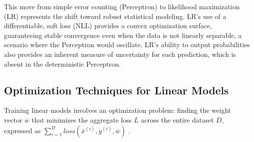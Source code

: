 \documentclass{article}
\begin{document}
This move from simple error counting (Perceptron) to likelihood maximization (LR) represents the shift toward robust statistical modeling. LR's use of a differentiable, soft loss (NLL) provides a convex optimization surface, guaranteeing stable convergence even when the data is not linearly separable, a scenario where the Perceptron would oscillate. LR’s ability to output probabilities also provides an inherent measure of uncertainty for each prediction, which is absent in the deterministic Perceptron.

\begin{table}[h!]
\centering
\caption{Comparison of Linear Binary Classifiers}
\end{table}

\subsection{Optimization Techniques for Linear Models}

Training linear models involves an optimization problem: finding the weight vector $\overline{w}$ that minimizes the aggregate loss $L$ across the entire dataset $D$, expressed as $\sum_{i=1}^{D}loss(\overline{x}^{(i)},y^{(i)},\overline{w})$ .
\end{document}
